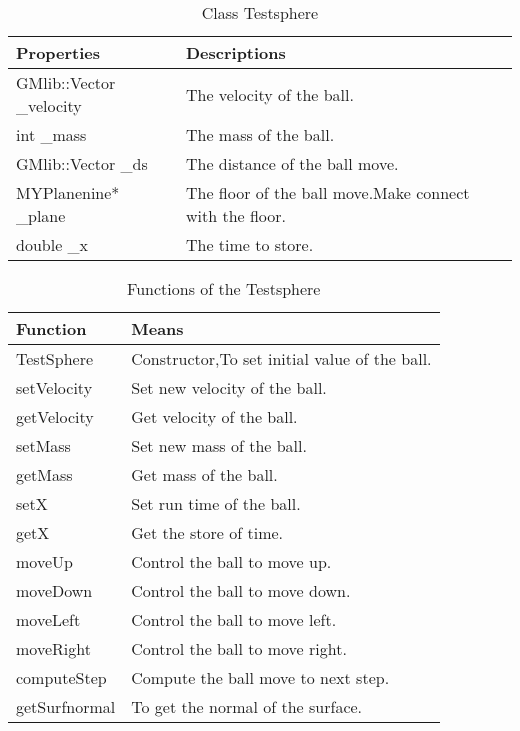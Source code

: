 \documentclass[a4,10pt]{article}
\begin{document}
\begin{table}[H]
\centering
\caption{Class Testsphere}
\label{my-label}
\begin{tabular}{ll}
\hline
\multicolumn{1}{|l|}{\textbf{Properties}}        & \multicolumn{1}{l|}{\textbf{Descriptions}}                                   \\ \hline
\multicolumn{1}{|l|}{GMlib::Vector \_velocity}   & \multicolumn{1}{l|}{The velocity of the ball.}                               \\ \hline
\multicolumn{1}{|l|}{int \_mass}                 & \multicolumn{1}{l|}{The mass of the ball.}                                   \\ \hline
\multicolumn{1}{|l|}{GMlib::Vector \_ds}         & \multicolumn{1}{l|}{The distance of the ball move.}                          \\ \hline
\multicolumn{1}{|l|}{MYPlanenine* \_plane}       & \multicolumn{1}{l|}{The floor of the ball move.Make connect with the floor.} \\ \hline
\multicolumn{1}{|l|}{double \_x}                 & \multicolumn{1}{l|}{The time to store.}                                      \\ \hline

\end{tabular}
\end{table}

\begin{table}[]
\centering
\caption{Functions of the Testsphere}
\label{my-label}
\begin{tabular}{|l|l|}
\hline
\textbf{Function} & \textbf{Means}                                \\ \hline
TestSphere        & Constructor,To set initial value of the ball. \\ \hline
setVelocity       & Set new velocity of the ball.                 \\ \hline
getVelocity       & Get velocity of the ball.                     \\ \hline
setMass           & Set new mass of the ball.                     \\ \hline
getMass           & Get mass of the ball.                         \\ \hline
setX              & Set run time of the ball.                     \\ \hline
getX              & Get the store of time.                        \\ \hline
moveUp            & Control the ball to move up.                  \\ \hline
moveDown          & Control the ball to move down.                \\ \hline
moveLeft          & Control the ball to move left.                \\ \hline
moveRight         & Control the ball to move right.               \\ \hline
computeStep       & Compute the ball move to next step.           \\ \hline
getSurfnormal     & To get the normal of the surface.             \\ \hline
\end{tabular}
\end{table}
\end{document}
